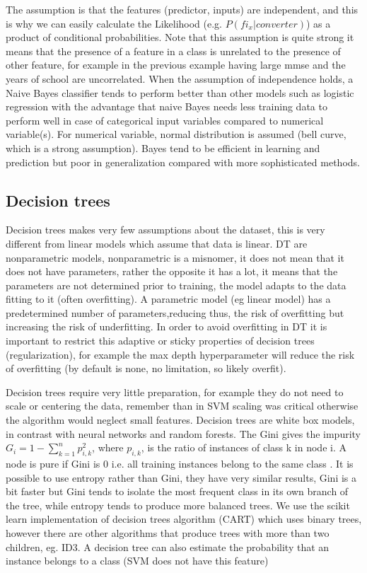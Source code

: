 \documentclass[11pt]{article}
\begin{document}
The assumption is that the features (predictor, inputs) are independent, and this is why we can easily calculate the Likelihood (e.g. $P(fi_x|converter)$) as a product of conditional probabilities. Note that this assumption is quite strong it means that the presence of a feature in a class is unrelated to the presence of other feature, for example in the previous example having large mmse and the years of school are uncorrelated.
When the assumption of independence holds, a Naive Bayes classifier tends to perform better than other models such as logistic regression with the advantage that naive Bayes needs less training data to perform well in case of categorical input variables compared to numerical variable(s). For numerical variable, normal distribution is assumed (bell curve, which is a strong assumption).
Bayes tend to be efficient in learning and prediction but poor in generalization compared with more sophisticated methods.

\subsection{Decision trees}
Decision trees makes very few assumptions about the dataset, this is very different from linear models which assume that data is linear. DT are nonparametric models, nonparametric is a misnomer, it does not mean that it does not have parameters, rather the opposite it has a lot, it means that the parameters are not determined prior to training, the model adapts to the data fitting to it (often overfitting). A parametric model (eg linear model) has a predetermined number of parameters,reducing thus, the risk of overfitting but increasing the risk of underfitting. In order to avoid overfitting in DT it is important to restrict this adaptive or sticky properties of decision trees (regularization), for example the max depth hyperparameter will reduce the risk of overfitting (by default is none, no limitation, so likely overfit).

Decision trees require very little preparation, for example they do not need to scale or centering the data, remember than in SVM scaling was critical otherwise the algorithm would neglect small features.
Decision trees are white box models, in contrast with neural networks and random forests. 
The Gini gives the impurity $G_i = 1- \sum_{k=1}^{n} p_{i,k}^2$, where $p_{i,k}$, is the ratio of instances of class k in node i. A node is pure if Gini is 0 i.e. all training instances belong to the same class . It is possible to use entropy rather than Gini, they have very similar results, Gini is a bit faster but Gini tends to isolate the most frequent class in its own branch of the tree, while entropy tends to produce more balanced trees. %
We use the scikit learn implementation of decision trees algorithm (CART) which uses binary trees, however there are other algorithms that produce trees with more than two children, eg. ID3.
A decision tree can also estimate the probability that an instance belongs to a class (SVM does not have this feature)
\end{document}
